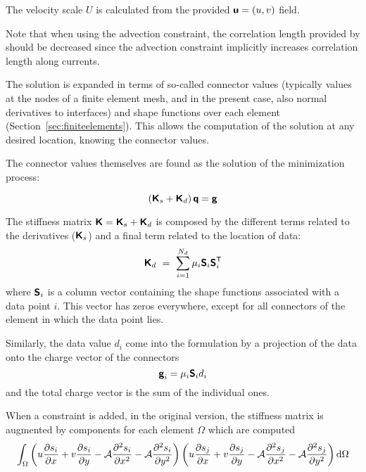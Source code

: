 The velocity scale $U$ is calculated from the provided $\mbox{\boldmath $ \protect\mathsf{u} $}=(u,v)$ field. 

Note that when using the advection constraint, the correlation length provided by  should be decreased since the advection 
constraint implicitly increases correlation length along currents.

The solution is expanded in terms of so-called connector values (typically values at the nodes of a finite element mesh, and in the present case, also normal derivatives to interfaces) and shape functions over each element (Section~\ref{sec:finiteelements}). This allows the computation of the solution at any desired location, knowing the connector values.

The connector values themselves are found as the solution of the minimization process:

\begin{equation}
\left( \mbox{\boldmath $ \protect\mathsf{K} $}_s + \mbox{\boldmath $ \protect\mathsf{K} $}_d \right) \mbox{\boldmath $ \protect\mathsf{q} $} = \mbox{\boldmath $ \protect\mathsf{g} $}
\end{equation}

The stiffness matrix $\mbox{\boldmath $ \protect\mathsf{K} $}=\mbox{\boldmath $ \protect\mathsf{K} $}_s + \mbox{\boldmath $ \protect\mathsf{K} $}_d$ is composed by the different terms related to the derivatives ($\mbox{\boldmath $ \protect\mathsf{K} $}_s$) and a final term related to the location of data:
\begin{equation}
\mbox{\boldmath $ \protect\mathsf{K} $}_d ~=~ \sum_{i=1}^{N_d} \mu_i \mbox{\boldmath $ \protect\mathsf{S} $}_i {\mbox{\boldmath $ \protect\mathsf{S} $}}^\mathsf{T}_i
\end{equation}
where $\mbox{\boldmath $ \protect\mathsf{S} $}_i$ is a column vector containing the shape functions associated with a data point $i$. This
vector has zeros everywhere, except for all connectors of the element in which the data point lies.

Similarly, the data value $d_i$ come into the formulation by a projection of the data onto the charge vector of the connectors
\begin{equation}
\mbox{\boldmath $ \protect\mathsf{g} $}_i = \mu_i \mbox{\boldmath $ \protect\mathsf{S} $}_i d_i
\label{eq:fromdatato}
\end{equation}
and the total charge vector is the sum of the individual ones.

When a constraint is added, in the original version, the stiffness matrix is augmented by components for each element $\Omega$ which are computed
\begin{equation}
\int_\Omega \left( u {\partial s_i \over \partial x}+v {\partial s_i \over \partial y}-\mathcal{A} {\partial^2 s_i \over \partial x^2} -\mathcal{A} {\partial^2 s_i \over \partial y^2}\right) \left( u {\partial s_j \over \partial x}+v {\partial s_j \over \partial y}-\mathcal{A} {\partial^2 s_j \over \partial x^2} -\mathcal{A} {\partial^2 s_j \over \partial y^2}\right)\mbox{d} \Omega
\end{equation}

